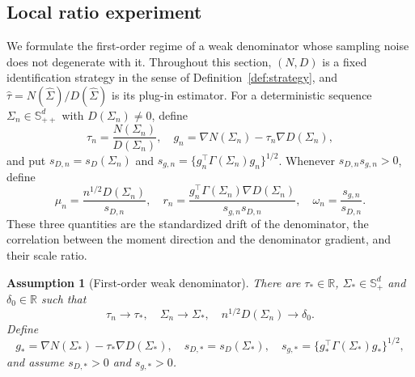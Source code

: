 \documentclass[12pt,a4paper]{article}
\theoremstyle{plain}
\newtheorem{assumption}{Assumption}
\theoremstyle{definition}
\newcommand{\R}{\mathbb{R}}
\newcommand{\Smat}{\mathbb{S}}
\newcommand{\Sighat}{\hat{\Sigma}}
\begin{document}
\subsection{Local ratio experiment}

We formulate the first-order regime of a weak denominator whose sampling noise does not degenerate with it.
Throughout this section, $(N,D)$ is a fixed identification strategy in the sense of Definition~\ref{def:strategy}, and $\hat{\tau}=N(\Sighat)/D(\Sighat)$ is its plug-in estimator.
For a deterministic sequence $\Sigma_n\in\Smat^d_{++}$ with $D(\Sigma_n)\ne0$, define
\begin{equation*}
    \tau_n
    =
    \frac{N(\Sigma_n)}{D(\Sigma_n)}
    ,\quad
    g_n
    =
    \nabla N(\Sigma_n)-\tau_n\nabla D(\Sigma_n)
    ,
\end{equation*}
and put $s_{D,n} = s_D(\Sigma_n)$ and $s_{g,n} = \{g_n^\top\Gamma(\Sigma_n)g_n\}^{1/2}$.
Whenever $s_{D,n}s_{g,n}>0$, define
\begin{equation}
\label{eq:invariants}
    \mu_n
    =
    \frac{n^{1/2}D(\Sigma_n)}{s_{D,n}}
    ,\quad
    r_n
    =
    \frac{g_n^\top\Gamma(\Sigma_n)\nabla D(\Sigma_n)}{s_{g,n}s_{D,n}}
    ,\quad
    \omega_n
    =
    \frac{s_{g,n}}{s_{D,n}}
    .
\end{equation}
These three quantities are the standardized drift of the denominator, the correlation between the moment direction and the denominator gradient, and their scale ratio.

\begin{assumption}[First-order weak denominator]
\label{ass:drift}
    There are $\tau_\ast\in\R$, $\Sigma_\ast\in\Smat^d_+$ and $\delta_0\in\R$ such that
    \begin{equation*}
        \tau_n\to\tau_\ast
        ,\quad
        \Sigma_n\to\Sigma_\ast
        ,\quad
        n^{1/2}D(\Sigma_n)\to\delta_0
        .
    \end{equation*}
    Define
    \begin{equation*}
        g_\ast
        =
        \nabla N(\Sigma_\ast)-\tau_\ast\nabla D(\Sigma_\ast)
        ,\quad
        s_{D,\ast}
        =
        s_D(\Sigma_\ast)
        ,\quad
        s_{g,\ast}
        =
        \{g_\ast^\top\Gamma(\Sigma_\ast)g_\ast\}^{1/2}
        ,
    \end{equation*}
    and assume $s_{D,\ast}>0$ and $s_{g,\ast}>0$.
\end{assumption}
\end{document}
